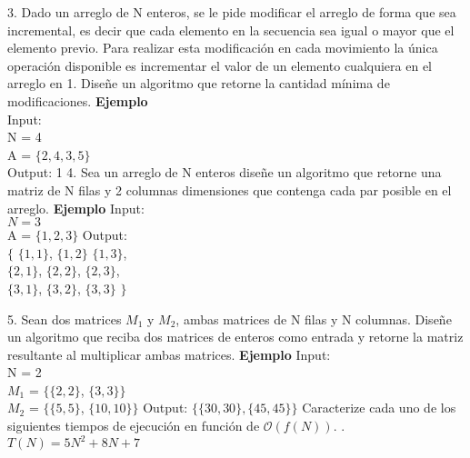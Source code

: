 \documentclass[12pt]{article}
\begin{document}
3. 
\newline 
Dado un arreglo de N enteros, se le pide modificar el arreglo de forma que sea incremental, es decir que cada elemento en la secuencia sea igual o mayor que el elemento previo.
Para realizar esta modificación en cada movimiento la única operación disponible es incrementar el valor de un elemento cualquiera en el arreglo en 1. Diseñe un algoritmo que retorne la cantidad mínima de modificaciones.
\newline
\newline
\textbf{Ejemplo}\\
Input: \\ N = 4 \\ A = $\{ 2, 4, 3, 5\}$ \\ 
Output: 1
\newline
\hspace{0.5cm}
4. 
\newline 
Sea un arreglo de N enteros diseñe un algoritmo que retorne una matriz de N filas y 2 columnas dimensiones que contenga cada par posible en el arreglo. 
\newline
\textbf{Ejemplo}
\newline
Input: \\$N = 3$ \\ A = $\{ 1, 2, 3\}$
\newline
Output: \\ 
$\{$ $\{ 1, 1\}$, $\{1, 2 \}$ $\{ 1, 3\}$, \\  $\{ 2, 1\}$, $\{ 2, 2\}$, $\{ 2, 3\}$, \\ $\{ 3, 1\}$, $\{ 3, 2\}$, $\{ 3, 3\}$ $\}$ 
\hspace{0.5cm}

5. 
\newline
Sean dos matrices $M_{1}$ y $M_{2}$, ambas matrices de N filas y N columnas. Diseñe un algoritmo que reciba dos matrices de enteros como entrada y retorne la matriz resultante al multiplicar ambas matrices.
\newline 
\textbf{Ejemplo}
Input: \\ N = 2 \\ $M_1$ = $ \{ \{ 2, 2\} $, $\{ 3, 3\} \}$ \\ $M_2$ = $ \{ \{ 5, 5\} $, $\{ 10, 10\} \}$ 
\newline 
Output: $\{ \{ 30, 30\}, \{ 45, 45\} \}$
\newpage
{}
Caracterize cada uno de los siguientes tiempos de ejecución en función de $\mathcal{O}(f(N))$.
. $T(N) = 5N^2 + 8N + 7$
\newline\hspace{0.5cm}
\end{document}
